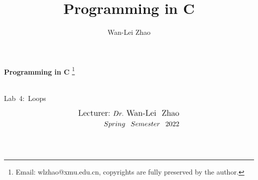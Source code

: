 \documentclass[t]{beamer}
\title{Programming in C}
\author{Wan-Lei Zhao}
\newcommand\blfootnote[1]{
  \begingroup
  \renewcommand\thefootnote{}\footnote{#1}
  \addtocounter{footnote}{-1}
  \endgroup
}
\begin{document}
\begin{frame}
   \begin{center}
    \vspace{24pt}
    \Huge\textbf{Programming in C}\blfootnote{Email: wlzhao@xmu.edu.cn, copyrights are fully preserved by the author.}\\
     \Huge{\mbox{Lab 4: }Loops}
    \vspace{36pt}
  \end{center}
  \begin{align*}
   \vspace{18pt}
      \large{\mbox{Lecturer:}~Dr.~\mbox{Wan-Lei~~Zhao}} \\
      \large{Spring~~Semester~~2022} \\
   \vspace{30pt}
  \end{align*}
\end{frame}



\section{}
\end{document}
